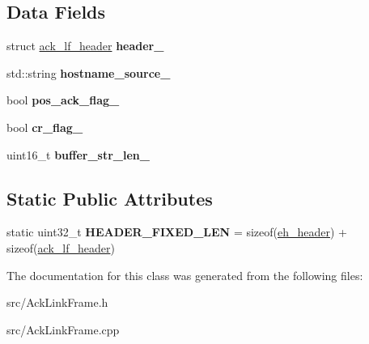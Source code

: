 \subsection*{Data Fields}
\begin{DoxyCompactItemize}
\item 
\hypertarget{classAckLinkFrame_ac860e1f06ef53be350ae1e65ceabe151}{struct \hyperlink{structack__lf__header}{ack\-\_\-lf\-\_\-header} {\bfseries header\-\_\-}}\label{classAckLinkFrame_ac860e1f06ef53be350ae1e65ceabe151}

\item 
\hypertarget{classAckLinkFrame_a88088f732bdeec470a86a4170debcd69}{std\-::string {\bfseries hostname\-\_\-source\-\_\-}}\label{classAckLinkFrame_a88088f732bdeec470a86a4170debcd69}

\item 
\hypertarget{classAckLinkFrame_af572f7dd3f8c75aa32ac5e4a0859d990}{bool {\bfseries pos\-\_\-ack\-\_\-flag\-\_\-}}\label{classAckLinkFrame_af572f7dd3f8c75aa32ac5e4a0859d990}

\item 
\hypertarget{classAckLinkFrame_a65e7d3de4d6eb35d760f70e1a877980b}{bool {\bfseries cr\-\_\-flag\-\_\-}}\label{classAckLinkFrame_a65e7d3de4d6eb35d760f70e1a877980b}

\item 
\hypertarget{classAckLinkFrame_a93e07e53838187874578ed6355d3a795}{uint16\-\_\-t {\bfseries buffer\-\_\-str\-\_\-len\-\_\-}}\label{classAckLinkFrame_a93e07e53838187874578ed6355d3a795}

\end{DoxyCompactItemize}
\subsection*{Static Public Attributes}
\begin{DoxyCompactItemize}
\item 
\hypertarget{classAckLinkFrame_a635114e77539990c03eae1a2cf630c22}{static uint32\-\_\-t {\bfseries H\-E\-A\-D\-E\-R\-\_\-\-F\-I\-X\-E\-D\-\_\-\-L\-E\-N} = sizeof(\hyperlink{structeh__header}{eh\-\_\-header}) + sizeof(\hyperlink{structack__lf__header}{ack\-\_\-lf\-\_\-header})}\label{classAckLinkFrame_a635114e77539990c03eae1a2cf630c22}

\end{DoxyCompactItemize}


The documentation for this class was generated from the following files\-:\begin{DoxyCompactItemize}
\item 
src/Ack\-Link\-Frame.\-h\item 
src/Ack\-Link\-Frame.\-cpp\end{DoxyCompactItemize}
